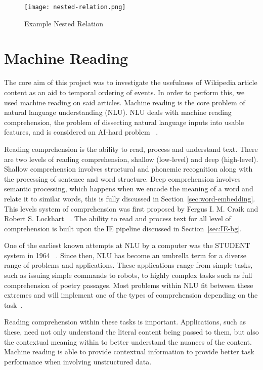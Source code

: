 \documentclass[bsc,frontabs,twoside,singlespacing,parskip,deptreport]{infthesis}     %
\begin{document}
\begin{figure}[H]
  \centering
  \texttt{[image: nested-relation.png]}
  \caption{Example Nested Relation}
  \label{fig:nested-relation}
\end{figure}


\section{Machine Reading}
The core aim of this project was to investigate the usefulness of Wikipedia article content as an aid to temporal ordering of events.
In order to perform this, we used machine reading on said articles.
Machine reading is the core problem of natural language understanding (NLU).
NLU deals with machine reading comprehension, the problem of dissecting natural language inputs into usable features,
and is considered an AI-hard problem ~\cite{yampolskiy2012ai}.

Reading comprehension is the ability to read, process and understand text.  
There are two levels of reading comprehension, shallow (low-level) and deep (high-level).
Shallow comprehension involves structural and phonemic recognition along with the processing of sentence and  word
structure.
Deep comprehension involves semantic processing, which happens when we encode the meaning of a word and relate it
to similar words, this is fully discussed in Section~\ref{sec:word-embedding}.
This levels system of comprehension was first proposed by  Fergus I. M. Craik and Robert S. Lockhart ~\cite{wagner2009beyond}.
The ability to read and process text for all level of comprehension is built upon the IE pipeline discussed in Section~\ref{sec:IE-bg}.

One of the earliest known attempts at NLU by a computer was the STUDENT system in 1964 ~\cite{russell1995modern}.
Since then, NLU has become an
umbrella term for a diverse range of problems and applications. These applications range from simple tasks, such as
issuing simple commands to robots, to highly complex tasks such as full comprehension of poetry passages.
Most problems within NLU fit between these extremes and will implement one of the types of comprehension
depending on the task~\cite{bookman2012trajectories}.

Reading comprehension within these tasks is important. Applications, such as these, need not only understand the literal content
being passed to them, but also the contextual meaning within to better understand the nuances of the content.
Machine reading is able to provide contextual information to provide better task performance when
involving unstructured data.
\end{document}
